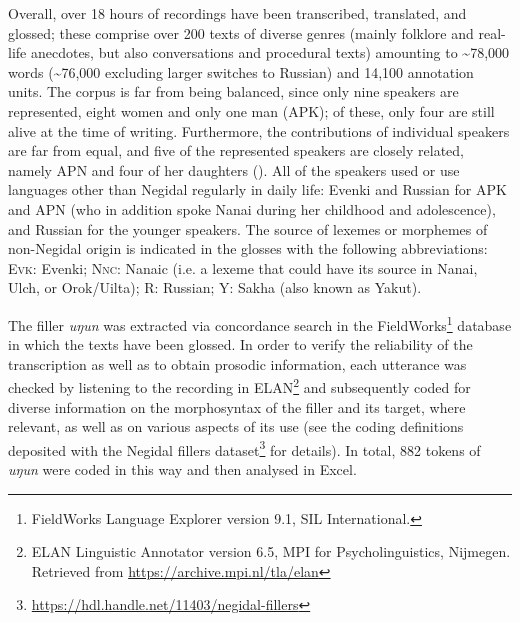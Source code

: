 \documentclass[output=paper]{langscibook}
\begin{document}
Overall, over 18 hours of recordings have been transcribed, translated, and glossed; these comprise over 200 texts of diverse genres (mainly folklore and real-life anecdotes, but also conversations and procedural texts) amounting to {\textasciitilde}78,000 words ({\textasciitilde}76,000 excluding larger switches to Russian) and 14,100 annotation units. The corpus is far from being balanced, since only nine speakers are represented, eight women and only one man (APK); of these, only four are still alive at the time of writing. Furthermore, the contributions of individual speakers are far from equal, and five of the represented speakers are closely related, namely APN and four of her daughters (). All of the speakers used or use languages other than Negidal regularly in daily life: Evenki and Russian for APK and APN (who in addition spoke Nanai during her childhood and adolescence), and Russian for the younger speakers. The source of lexemes or morphemes of non-Negidal origin is indicated in the glosses with the following abbreviations: \textsc{Evk}: Evenki; \textsc{Nnc}: Nanaic (i.e. a lexeme that could have its source in Nanai, Ulch, or Orok/Uilta); R: Russian; Y: Sakha (also known as Yakut).

The filler \textit{uŋun} was extracted via concordance search in the FieldWorks\footnote{FieldWorks Language Explorer version 9.1, SIL International.} database in which the texts have been glossed. In order to verify the reliability of the transcription as well as to obtain prosodic information, each utterance was checked by listening to the recording in ELAN\footnote{ELAN Linguistic Annotator version 6.5, MPI for Psycholinguistics, Nijmegen. Retrieved from \url{https://archive.mpi.nl/tla/elan}} and subsequently coded for diverse information on the morphosyntax of the filler and its target, where relevant, as well as on various aspects of its use (see the coding definitions deposited with the Negidal fillers dataset\footnote{\url{https://hdl.handle.net/11403/negidal-fillers}} for details). In total, 882 tokens of \textit{uŋun} were coded in this way and then analysed in Excel. 
\end{document}
